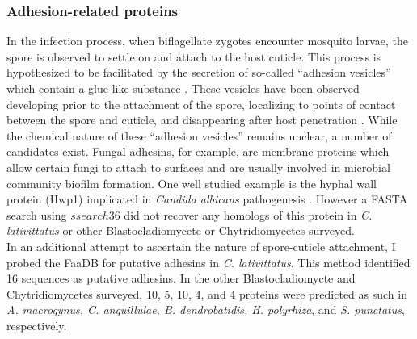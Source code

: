 \subsubsection*{Adhesion-related proteins}
In the infection process, when biflagellate zygotes encounter mosquito larvae, the spore is observed to settle on and attach to the host cuticle. This process is hypothesized to be facilitated by the secretion of so-called \enquote{adhesion vesicles} which contain a glue-like substance \cite{Travland1979}. These vesicles have been observed developing prior to the attachment of the spore, localizing to points of contact between the spore and cuticle, and disappearing after host penetration \cite{Travland1979}. While the chemical nature of these \enquote{adhesion vesicles} remains unclear, a number of candidates exist. Fungal adhesins, for example, are membrane proteins which allow certain fungi to attach to surfaces and are usually involved in microbial community biofilm formation. One well studied example is the hyphal wall protein (Hwp1) implicated in \textit{Candida albicans} pathogenesis \cite{Staab1999}. However a FASTA search using $ssearch36$ did not recover any homologs of this protein in \textit{C. lativittatus} or other Blastocladiomycete or Chytridiomycetes surveyed.\\
\indent In an additional attempt to ascertain the nature of spore-cuticle attachment, I probed the FaaDB for putative adhesins in \textit{C. lativittatus}. This method identified 16 sequences as putative adhesins. In the other Blastocladiomycte and Chytridiomycetes surveyed, 10, 5, 10, 4, and 4 proteins were predicted as such in \textit{A. macrogynus, C. anguillulae, B. dendrobatidis, H. polyrhiza}, and \textit{S. punctatus}, respectively.\\
